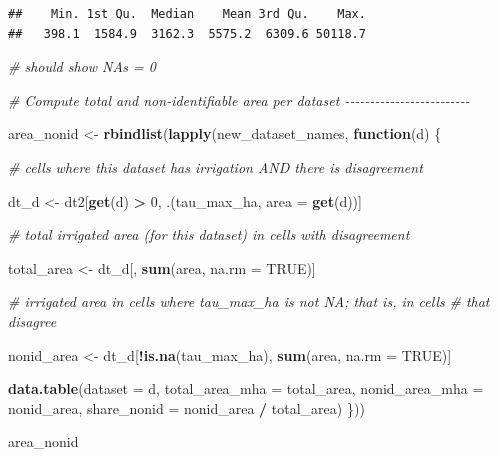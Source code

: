 \documentclass[
  11pt,
]{article}
\newenvironment{Shaded}{\begin{snugshade}}{\end{snugshade}}
\newcommand{\AttributeTok}[1]{\textcolor[rgb]{0.13,0.29,0.53}{#1}}
\newcommand{\CommentTok}[1]{\textcolor[rgb]{0.56,0.35,0.01}{\textit{#1}}}
\newcommand{\ConstantTok}[1]{\textcolor[rgb]{0.56,0.35,0.01}{#1}}
\newcommand{\ControlFlowTok}[1]{\textcolor[rgb]{0.13,0.29,0.53}{\textbf{#1}}}
\newcommand{\DecValTok}[1]{\textcolor[rgb]{0.00,0.00,0.81}{#1}}
\newcommand{\FunctionTok}[1]{\textcolor[rgb]{0.13,0.29,0.53}{\textbf{#1}}}
\newcommand{\NormalTok}[1]{#1}
\newcommand{\OtherTok}[1]{\textcolor[rgb]{0.56,0.35,0.01}{#1}}
\newcommand{\SpecialCharTok}[1]{\textcolor[rgb]{0.81,0.36,0.00}{\textbf{#1}}}
\begin{document}
\begin{verbatim}
##    Min. 1st Qu.  Median    Mean 3rd Qu.    Max. 
##   398.1  1584.9  3162.3  5575.2  6309.6 50118.7
\end{verbatim}

\begin{Shaded}
\begin{Highlighting}[]
\CommentTok{\# should show NA\textquotesingle{}s = 0}

\CommentTok{\# Compute total and non{-}identifiable area per dataset {-}{-}{-}{-}{-}{-}{-}{-}{-}{-}{-}{-}{-}{-}{-}{-}{-}{-}{-}{-}{-}{-}{-}{-}{-}}

\NormalTok{area\_nonid }\OtherTok{\textless{}{-}} \FunctionTok{rbindlist}\NormalTok{(}\FunctionTok{lapply}\NormalTok{(new\_dataset\_names, }\ControlFlowTok{function}\NormalTok{(d) \{}

  \CommentTok{\# cells where this dataset has irrigation AND there is disagreement}

\NormalTok{  dt\_d }\OtherTok{\textless{}{-}}\NormalTok{ dt2[}\FunctionTok{get}\NormalTok{(d) }\SpecialCharTok{\textgreater{}} \DecValTok{0}\NormalTok{, .(tau\_max\_ha, }\AttributeTok{area =} \FunctionTok{get}\NormalTok{(d))]}

  \CommentTok{\# total irrigated area (for this dataset) in cells with disagreement}

\NormalTok{  total\_area }\OtherTok{\textless{}{-}}\NormalTok{ dt\_d[, }\FunctionTok{sum}\NormalTok{(area, }\AttributeTok{na.rm =} \ConstantTok{TRUE}\NormalTok{)]}

  \CommentTok{\# irrigated area in cells where tau\_max\_ha is not NA; that is, in cells}
  \CommentTok{\# that disagree}

\NormalTok{  nonid\_area }\OtherTok{\textless{}{-}}\NormalTok{ dt\_d[}\SpecialCharTok{!}\FunctionTok{is.na}\NormalTok{(tau\_max\_ha), }\FunctionTok{sum}\NormalTok{(area, }\AttributeTok{na.rm =} \ConstantTok{TRUE}\NormalTok{)]}

  \FunctionTok{data.table}\NormalTok{(}\AttributeTok{dataset =}\NormalTok{ d, }\AttributeTok{total\_area\_mha =}\NormalTok{ total\_area,}
             \AttributeTok{nonid\_area\_mha =}\NormalTok{ nonid\_area, }\AttributeTok{share\_nonid =}\NormalTok{ nonid\_area }\SpecialCharTok{/}\NormalTok{ total\_area)}
\NormalTok{\}))}

\NormalTok{area\_nonid}
\end{Highlighting}
\end{Shaded}
\end{document}
